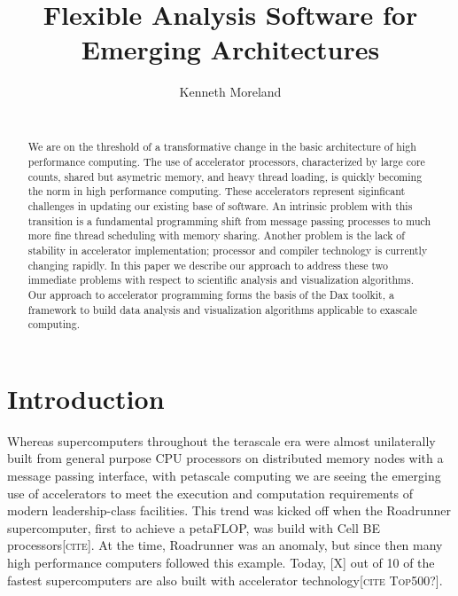 \documentclass{sig-alternate}
\author{
  \alignauthor Kenneth Moreland \\
  \myaffaddr{Sandia National Laboratories} \\
  \myemail{kmorel@sandia.gov}
}
\title{Flexible Analysis Software for Emerging Architectures}
\newcommand{\fix}[1]{{\color{red}\textsc{[#1]}}}
\begin{document}
\sloppy

\maketitle

\begin{abstract}
  We are on the threshold of a transformative change in the basic
  architecture of high performance computing.  The use of accelerator
  processors, characterized by large core counts, shared but asymetric
  memory, and heavy thread loading, is quickly becoming the norm in high
  performance computing.  These accelerators represent siginficant
  challenges in updating our existing base of software.  An intrinsic
  problem with this transition is a fundamental programming shift from
  message passing processes to much more fine thread scheduling with memory
  sharing.  Another problem is the lack of stability in accelerator
  implementation; processor and compiler technology is currently changing
  rapidly.  In this paper we describe our approach to address these two
  immediate problems with respect to scientific analysis and visualization
  algorithms.  Our approach to accelerator programming forms the basis of
  the Dax toolkit, a framework to build data analysis and visualization
  algorithms applicable to exascale computing.
\end{abstract}

\section{Introduction}
\label{sec:Introduction}

\noindent
Whereas supercomputers throughout the terascale era were almost
unilaterally built from general purpose CPU processors on distributed
memory nodes with a message passing interface, with petascale computing we
are seeing the emerging use of accelerators to meet the execution and
computation requirements of modern leadership-class facilities.  This trend
was kicked off when the Roadrunner supercomputer, first to achieve a
petaFLOP, was build with Cell BE processors\fix{cite}.  At the time,
Roadrunner was an anomaly, but since then many high performance computers
followed this example.  Today, \fix{X} out of 10 of the fastest supercomputers
are also built with accelerator technology\fix{cite Top500?}.
\end{document}
